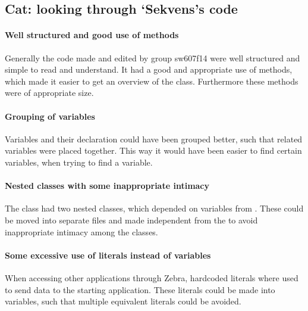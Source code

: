 \subsection{Cat: looking through `Sekvens's code}\label{subsec:collab_sekvenscorrections}

\paragraph{Well structured and good use of methods}
Generally the code made and edited by group sw607f14 were well structured and simple to read and understand. It had a good and appropriate use of methods, which made it easier to get an overview of the class. Furthermore these methods were of appropriate size.

\paragraph{Grouping of variables}
Variables and their declaration could have been grouped better, such that related variables were placed together. This way it would have been easier to find certain variables, when trying to find a variable.

\paragraph{Nested classes with some inappropriate intimacy}
The class  had two nested classes, which depended on variables from . These could be moved into separate files and made independent from the  to avoid inappropriate intimacy among the classes.

\paragraph{Some excessive use of literals instead of variables}
When accessing other applications through Zebra, hardcoded literals where used to send data to the starting application. These literals could be made into variables, such that multiple equivalent literals could be avoided.
